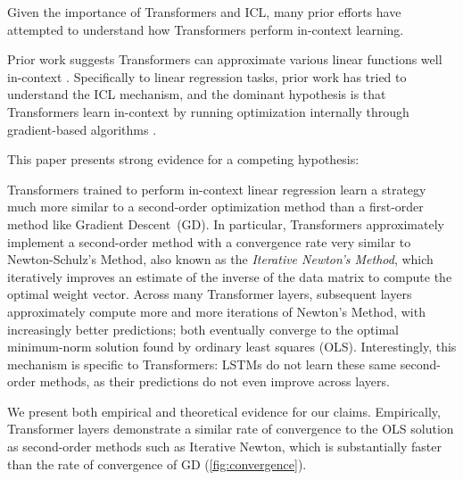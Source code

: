\documentclass[11pt]{article}
\theoremstyle{plain}
\theoremstyle{definition}
\theoremstyle{remark}
\renewcommand{\^}[1]{^{(#1)}}
\newcommand{\gd}{Gradient Descent}
\newcommand{\newton}{Iterative Newton}
\begin{document}
Given the importance of Transformers and ICL, many prior efforts have attempted to understand how Transformers perform in-context learning.

Prior work suggests Transformers can approximate various linear functions well in-context \citep{Garg2022WhatCT}.
Specifically to linear regression tasks, prior work has tried to understand the ICL mechanism, and the dominant hypothesis is that Transformers learn in-context by running optimization internally through gradient-based algorithms \citep{Oswald2022TransformersLI,Oswald2023UncoveringMA,Ahn2023TransformersLT,Dai2023WhyCG,mahankali2024one}. 

This paper presents strong evidence for a competing hypothesis:

Transformers trained to perform in-context linear regression learn a strategy much more similar to a second-order optimization method than a first-order method like \gd\ (GD). 
In particular, Transformers approximately implement a second-order method with a convergence rate very similar to Newton-Schulz's Method, also known as the \textit{Iterative Newton's Method}, which iteratively improves an estimate of the inverse of the data matrix to compute the optimal weight vector.
Across many Transformer layers, subsequent layers approximately compute more and more iterations of Newton's Method, with increasingly better predictions; both eventually converge to the optimal minimum-norm solution found by ordinary least squares (OLS). 
Interestingly, this mechanism is specific to Transformers: LSTMs do not learn these same second-order methods, as their predictions do not even improve across layers.

We present both empirical and theoretical evidence for our claims. Empirically, Transformer layers demonstrate a similar rate of convergence to the OLS solution as second-order methods such as \newton, which is substantially faster than the rate of convergence of GD (\cref{fig:convergence}). 
\end{document}
